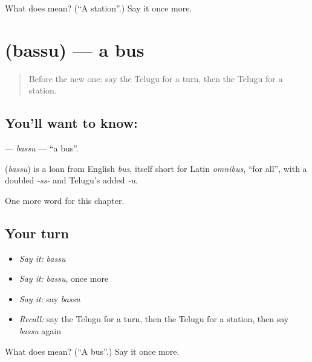 \begin{tcolorbox}[breakable,colback=teal!4,colframe=teal!35!black,title={Before you move on}]
What does  mean? (\textquotedblleft{}A station\textquotedblright{}.) Say it once more.
\end{tcolorbox}
\section[\texorpdfstring{\te{బస్సు} (bassu)}{బస్సు (bassu)}]{ (bassu) — a bus}

\label{lesson:TE-C105-bassu}



\begin{quote}
Before the new one: say the Telugu for a turn, then the Telugu for a station.
\end{quote}

\subsection*{You'll want to know: }
\textbf{} — \emph{bassu} — \textquotedblleft{}a bus\textquotedblright{}.

\begin{cousinweb}
\textbf{} (\emph{bassu}) is a loan from English \emph{bus}, itself short for Latin \emph{omnibus}, \textquotedblleft{}for all\textquotedblright{}, with a doubled \emph{-ss-} and Telugu's added \emph{-u}.
\end{cousinweb}

\begin{grammarlens}[title={What you've built}]
One more word for this chapter.
\end{grammarlens}

\subsection*{Your turn}
\begin{itemize}
\raggedright
  \item \emph{Say it:} \emph{bassu}
  \item \emph{Say it:} \emph{bassu}, once more
  \item \emph{Say it:} say \emph{bassu}
  \item \emph{Recall:} say the Telugu for a turn, then the Telugu for a station, then say \emph{bassu} again
\end{itemize}

\begin{tcolorbox}[breakable,colback=teal!4,colframe=teal!35!black,title={Before you move on}]
What does  mean? (\textquotedblleft{}A bus\textquotedblright{}.) Say it once more.
\end{tcolorbox}
